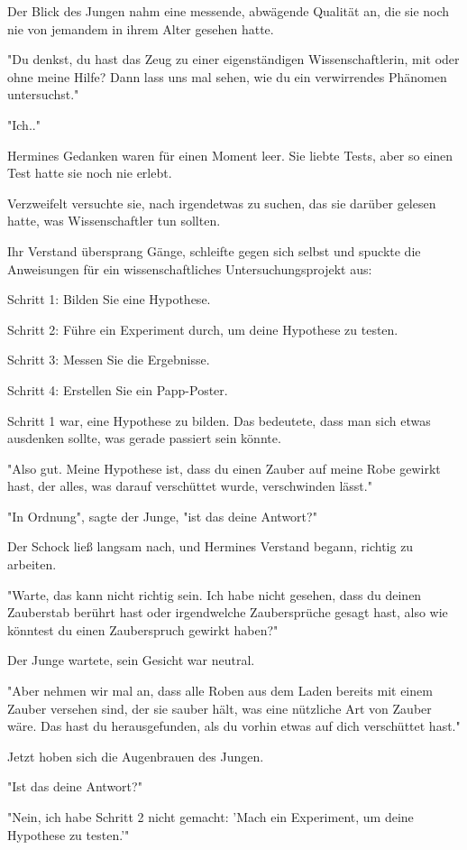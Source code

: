 {Der Blick des Jungen nahm eine messende, abwägende Qualität an, die sie noch nie von jemandem in ihrem Alter gesehen hatte.

"Du denkst, du hast das Zeug zu einer eigenständigen Wissenschaftlerin, mit oder ohne meine Hilfe? Dann lass uns mal sehen, wie du ein verwirrendes Phänomen untersuchst."

"Ich.."

Hermines Gedanken waren für einen Moment leer. Sie liebte Tests, aber so einen Test hatte sie noch nie erlebt.

Verzweifelt versuchte sie, nach irgendetwas zu suchen, das sie darüber gelesen hatte, was Wissenschaftler tun sollten.

Ihr Verstand übersprang Gänge, schleifte gegen sich selbst und spuckte die Anweisungen für ein wissenschaftliches Untersuchungsprojekt aus:

Schritt 1: Bilden Sie eine Hypothese.

Schritt 2: Führe ein Experiment durch, um deine Hypothese zu testen.

Schritt 3: Messen Sie die Ergebnisse.

Schritt 4: Erstellen Sie ein Papp-Poster.

Schritt 1 war, eine Hypothese zu bilden. Das bedeutete, dass man sich etwas ausdenken sollte, was gerade passiert sein könnte.

"Also gut. Meine Hypothese ist, dass du einen Zauber auf meine Robe gewirkt hast, der alles, was darauf verschüttet wurde, verschwinden lässt."

"In Ordnung", sagte der Junge, "ist das deine Antwort?"

Der Schock ließ langsam nach, und Hermines Verstand begann, richtig zu arbeiten.

"Warte, das kann nicht richtig sein. Ich habe nicht gesehen, dass du deinen Zauberstab berührt hast oder irgendwelche Zaubersprüche gesagt hast, also wie könntest du einen Zauberspruch gewirkt haben?"

Der Junge wartete, sein Gesicht war neutral.

"Aber nehmen wir mal an, dass alle Roben aus dem Laden bereits mit einem Zauber versehen sind, der sie sauber hält, was eine nützliche Art von Zauber wäre. Das hast du herausgefunden, als du vorhin etwas auf dich verschüttet hast."

Jetzt hoben sich die Augenbrauen des Jungen.

"Ist das deine Antwort?"

"Nein, ich habe Schritt 2 nicht gemacht: 'Mach ein Experiment, um deine Hypothese zu testen.'"

}
